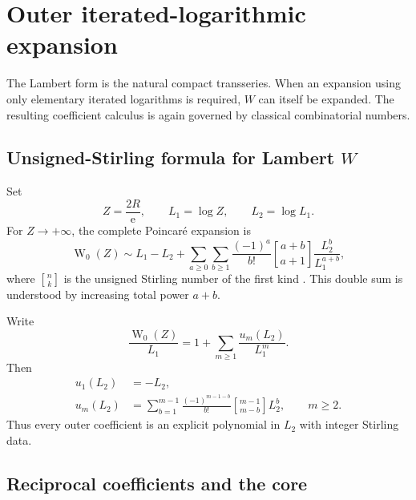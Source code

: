 \documentclass[11pt,a4paper,oneside]{article}
\theoremstyle{plain}
\theoremstyle{definition}
\theoremstyle{remark}
\newcommand{\e}{\mathrm e}
\newcommand{\W}{\operatorname W}
\newcommand{\stirlingone}[2]{\genfrac{[}{]}{0pt}{}{#1}{#2}}
\begin{document}
\section{Outer iterated-logarithmic expansion}
\label{sec:outer}

The Lambert form is the natural compact transseries.  When an expansion using
only elementary iterated logarithms is required, $W$ can itself be expanded.
The resulting coefficient calculus is again governed by classical
combinatorial numbers.

\subsection{Unsigned-Stirling formula for Lambert \texorpdfstring{$W$}{W}}

Set
\begin{equation}
 Z=\frac{2R}{\e},
 \qquad L_1=\log Z,
 \qquad L_2=\log L_1.
 \label{eq:L1-L2-def}
\end{equation}
For $Z\to+\infty$, the complete Poincar\'e expansion is
\begin{equation}
 \W_0(Z)\sim L_1-L_2+
 \sum_{a\ge0}\sum_{b\ge1}
 \frac{(-1)^a}{b!}
 \stirlingone{a+b}{a+1}
 \frac{L_2^b}{L_1^{a+b}},
 \label{eq:W-Stirling-expansion}
\end{equation}
where $\stirlingone{n}{k}$ is the unsigned Stirling number of the first
kind \cite{Corless,DLMFW}.  This double sum is understood by increasing total
power $a+b$.

Write
\begin{equation}
 \frac{\W_0(Z)}{L_1}=1+\sum_{m\ge1}\frac{u_m(L_2)}{L_1^m}.
 \label{eq:u-def}
\end{equation}
Then
\begin{align}
 u_1(L_2)&=-L_2,
 \label{eq:u1}\\
 u_m(L_2)&=
 \sum_{b=1}^{m-1}\frac{(-1)^{m-1-b}}{b!}
 \stirlingone{m-1}{m-b}L_2^b,
 \qquad m\ge2.
 \label{eq:um-general}
\end{align}
Thus every outer coefficient is an explicit polynomial in $L_2$ with integer
Stirling data.

\subsection{Reciprocal coefficients and the core}
\end{document}
